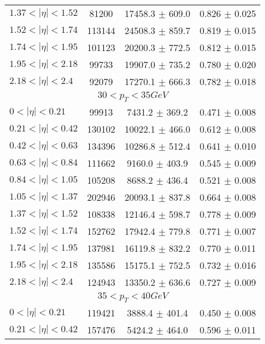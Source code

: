 \begin{tabular}{lccc}
$1.37 < |\eta| <1.52$          & 81200      & 17458.3    $\pm$ 609.0 & 0.826      $\pm$ 0.025 \\
$1.52 < |\eta| <1.74$          & 113144     & 24508.3    $\pm$ 859.7 & 0.819      $\pm$ 0.015 \\
$1.74 < |\eta| <1.95$          & 101123     & 20200.3    $\pm$ 772.5 & 0.812      $\pm$ 0.015 \\
$1.95 < |\eta| <2.18$          & 99733      & 19907.0    $\pm$ 735.2 & 0.780      $\pm$ 0.020 \\
$2.18 < |\eta| <2.4$           & 92079      & 17270.1    $\pm$ 666.3 & 0.782      $\pm$ 0.018 \\
\hline
\multicolumn{4}{c}{$30 < p_{T} < 35 GeV$} \\
\hline
$0 < |\eta| <0.21$             & 99913      & 7431.2     $\pm$ 369.2 & 0.471      $\pm$ 0.008 \\
$0.21 < |\eta| <0.42$          & 130102     & 10022.1    $\pm$ 466.0 & 0.612      $\pm$ 0.008 \\
$0.42 < |\eta| <0.63$          & 134396     & 10286.8    $\pm$ 512.4 & 0.641      $\pm$ 0.010 \\
$0.63 < |\eta| <0.84$          & 111662     & 9160.0     $\pm$ 403.9 & 0.545      $\pm$ 0.009 \\
$0.84 < |\eta| <1.05$          & 105208     & 8688.2     $\pm$ 436.4 & 0.521      $\pm$ 0.008 \\
$1.05 < |\eta| <1.37$          & 202946     & 20093.1    $\pm$ 837.8 & 0.664      $\pm$ 0.008 \\
$1.37 < |\eta| <1.52$          & 108338     & 12146.4    $\pm$ 598.7 & 0.778      $\pm$ 0.009 \\
$1.52 < |\eta| <1.74$          & 152762     & 17942.4    $\pm$ 779.8 & 0.771      $\pm$ 0.007 \\
$1.74 < |\eta| <1.95$          & 137981     & 16119.8    $\pm$ 832.2 & 0.770      $\pm$ 0.011 \\
$1.95 < |\eta| <2.18$          & 135586     & 15175.1    $\pm$ 752.5 & 0.732      $\pm$ 0.016 \\
$2.18 < |\eta| <2.4$           & 124943     & 13350.2    $\pm$ 636.6 & 0.727      $\pm$ 0.009 \\
\hline
\multicolumn{4}{c}{$35 < p_{T} < 40 GeV$} \\
\hline
$0 < |\eta| <0.21$             & 119421     & 3888.4     $\pm$ 401.4 & 0.450      $\pm$ 0.008 \\
$0.21 < |\eta| <0.42$          & 157476     & 5424.2     $\pm$ 464.0 & 0.596      $\pm$ 0.011 \\

\end{tabular}
